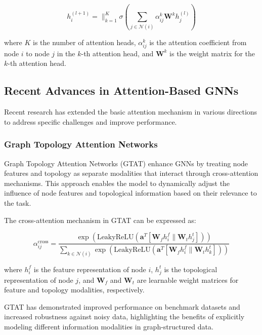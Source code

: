 \documentclass{article}
\begin{document}
\begin{equation}
h_i^{(l+1)} = \|_{k=1}^K \sigma\left(\sum_{j \in \mathcal{N}(i)} \alpha_{ij}^k \mathbf{W}^k h_j^{(l)}\right)
\end{equation}

where $K$ is the number of attention heads, $\alpha_{ij}^k$ is the attention coefficient from node $i$ to node $j$ in the $k$-th attention head, and $\mathbf{W}^k$ is the weight matrix for the $k$-th attention head.

\subsection{Recent Advances in Attention-Based GNNs}

Recent research has extended the basic attention mechanism in various directions to address specific challenges and improve performance.

\subsubsection{Graph Topology Attention Networks}

Graph Topology Attention Networks (GTAT) \cite{shen2025gtat} enhance GNNs by treating node features and topology as separate modalities that interact through cross-attention mechanisms. This approach enables the model to dynamically adjust the influence of node features and topological information based on their relevance to the task.

The cross-attention mechanism in GTAT can be expressed as:

\begin{equation}
\alpha_{ij}^{\text{cross}} = \frac{\exp\left(\text{LeakyReLU}\left(\mathbf{a}^T[\mathbf{W}_f h_i^f \| \mathbf{W}_t h_j^t]\right)\right)}{\sum_{k \in \mathcal{N}(i)} \exp\left(\text{LeakyReLU}\left(\mathbf{a}^T[\mathbf{W}_f h_i^f \| \mathbf{W}_t h_k^t]\right)\right)}
\end{equation}

where $h_i^f$ is the feature representation of node $i$, $h_j^t$ is the topological representation of node $j$, and $\mathbf{W}_f$ and $\mathbf{W}_t$ are learnable weight matrices for feature and topology modalities, respectively.

GTAT has demonstrated improved performance on benchmark datasets and increased robustness against noisy data, highlighting the benefits of explicitly modeling different information modalities in graph-structured data.
\end{document}
